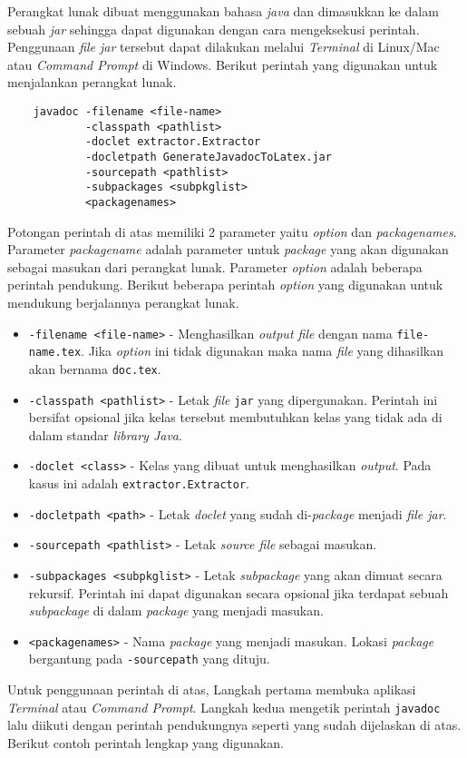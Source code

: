Perangkat lunak dibuat menggunakan bahasa {\it java} dan dimasukkan ke dalam sebuah {\it jar} sehingga dapat digunakan dengan cara mengeksekusi perintah. Penggunaan {\it file jar} tersebut dapat dilakukan melalui {\it Terminal} di Linux/Mac atau {\it Command Prompt} di Windows. Berikut perintah yang digunakan untuk menjalankan perangkat lunak.
\begin{verbatim}
	javadoc -filename <file-name>
	        -classpath <pathlist>
	        -doclet extractor.Extractor
	        -docletpath GenerateJavadocToLatex.jar
	        -sourcepath <pathlist>
	        -subpackages <subpkglist>
	        <packagenames>
\end{verbatim}
Potongan perintah di atas memiliki 2 parameter yaitu {\it option} dan {\it packagenames}. Parameter {\it packagename} adalah parameter untuk {\it package} yang akan digunakan sebagai masukan dari perangkat lunak. Parameter {\it option} adalah beberapa perintah pendukung. Berikut beberapa perintah {\it option} yang digunakan untuk mendukung berjalannya perangkat lunak.
\begin{itemize}
	\item {\tt -filename <file-name>} - Menghasilkan {\it output file} dengan nama {\tt file-name.tex}. Jika {\it option} ini tidak digunakan maka nama {\it file} yang dihasilkan akan bernama {\tt doc.tex}.
	\item {\tt -classpath <pathlist>} - Letak {\it file} {\tt jar} yang dipergunakan. Perintah ini bersifat opsional jika kelas tersebut membutuhkan kelas yang tidak ada di dalam standar {\it library Java}.
	\item {\tt -doclet <class>} - Kelas yang dibuat untuk menghasilkan {\it output}. Pada kasus ini adalah {\tt extractor.Extractor}.
	\item {\tt -docletpath <path>} - Letak {\it doclet} yang sudah di-{\it package} menjadi {\it file jar}.
	\item {\tt -sourcepath <pathlist>} - Letak {\it source file} sebagai masukan. 
	\item {\tt -subpackages <subpkglist>} - Letak {\it subpackage} yang akan dimuat secara rekursif. Perintah ini dapat digunakan secara opsional jika terdapat sebuah {\it subpackage} di dalam {\it package} yang menjadi masukan.
	\item {\tt <packagenames>} - Nama {\it package} yang menjadi masukan. Lokasi {\it package} bergantung pada {\tt -sourcepath} yang dituju.
\end{itemize}

Untuk penggunaan perintah di atas, Langkah pertama membuka aplikasi {\it Terminal} atau {\it Command Prompt}. Langkah kedua mengetik perintah {\tt javadoc} lalu diikuti dengan perintah pendukungnya seperti yang sudah dijelaskan di atas. Berikut contoh perintah lengkap yang digunakan.

